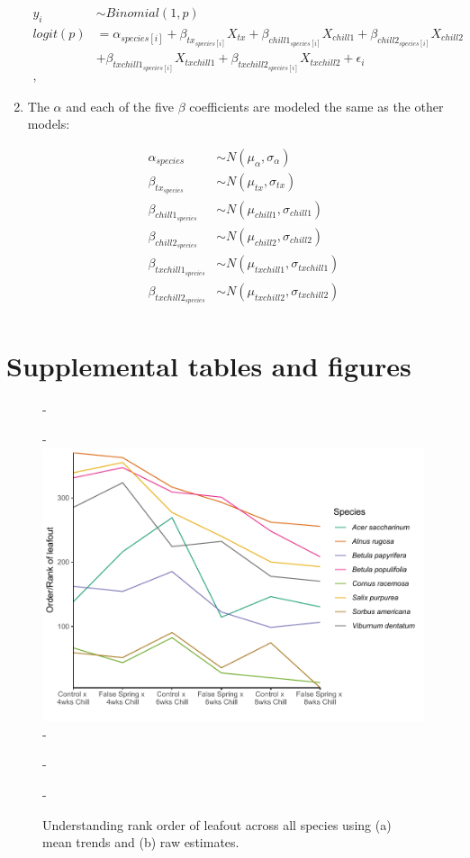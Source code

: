 \documentclass{article}\usepackage[]{graphicx}\usepackage[]{color}
\begin{document}
\begin{enumerate}
\begin{align*}
 y_i & \sim Binomial(1,p) \tag{2} \\
logit(p) &= \alpha_{species[i]} + \beta_{tx_{species[i]}}X_{tx} + \beta_{chill1_{species[i]}}X_{chill1} + \beta_{chill2_{species[i]}}X_{chill2}\\
&+ \beta_{txchill1_{species[i]}}X_{txchill1} + \beta_{txchill2_{species[i]}}X_{txchill2} + \epsilon_i \nonumber\\,
\end{align*}

\item The $\alpha$ and each of the five $\beta$ coefficients are modeled the same as the other models:

\begin{align*}
\alpha_{species} & \sim N(\mu_{\alpha}, \sigma_{\alpha}) \\
\beta_{tx_{species}} & \sim N(\mu_{tx}, \sigma_{tx}) \\
\beta_{chill1_{species}} & \sim N(\mu_{chill1}, \sigma_{chill1}) \\
\beta_{chill2_{species}} & \sim N(\mu_{chill2}, \sigma_{chill2}) \\
\beta_{txchill1_{species}} & \sim N(\mu_{txchill1}, \sigma_{txchill1}) \\
\beta_{txchill2_{species}} & \sim N(\mu_{txchill2}, \sigma_{txchill2}) \\
\end{align*}

\end{enumerate}

\section*{Supplemental tables and figures}
  
{\begin{figure} [H]
  -\begin{center}
  -\includegraphics[width=12cm]{..//analyses/figures/budsetorder_byrank.pdf} 
  -\caption{Understanding rank order of leafout across all species using (a) mean trends and (b) raw estimates. }\label{fig:bsetrank}
  -\end{center}
  -\end{figure}}
\end{document}
